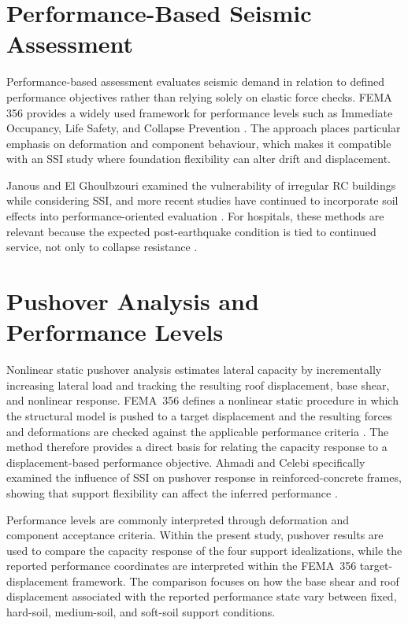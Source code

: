 \section{Performance-Based Seismic Assessment}
Performance-based assessment evaluates seismic demand in relation to defined performance objectives rather than relying solely on elastic force checks. FEMA 356 provides a widely used framework for performance levels such as Immediate Occupancy, Life Safety, and Collapse Prevention \cite{fema356}. The approach places particular emphasis on deformation and component behaviour, which makes it compatible with an SSI study where foundation flexibility can alter drift and displacement.

Janous and El Ghoulbzouri examined the vulnerability of irregular RC buildings while considering SSI, and more recent studies have continued to incorporate soil effects into performance-oriented evaluation \cite{janous2024,oggu2025}. For hospitals, these methods are relevant because the expected post-earthquake condition is tied to continued service, not only to collapse resistance \cite{subedi2022}.

\section{Pushover Analysis and Performance Levels}
Nonlinear static pushover analysis estimates lateral capacity by incrementally increasing lateral load and tracking the resulting roof displacement, base shear, and nonlinear response. FEMA~356 defines a nonlinear static procedure in which the structural model is pushed to a target displacement and the resulting forces and deformations are checked against the applicable performance criteria \cite{fema356}. The method therefore provides a direct basis for relating the capacity response to a displacement-based performance objective. Ahmadi and Celebi specifically examined the influence of SSI on pushover response in reinforced-concrete frames, showing that support flexibility can affect the inferred performance \cite{ahmadi2018}.

Performance levels are commonly interpreted through deformation and component acceptance criteria. Within the present study, pushover results are used to compare the capacity response of the four support idealizations, while the reported performance coordinates are interpreted within the FEMA~356 target-displacement framework. The comparison focuses on how the base shear and roof displacement associated with the reported performance state vary between fixed, hard-soil, medium-soil, and soft-soil support conditions.

